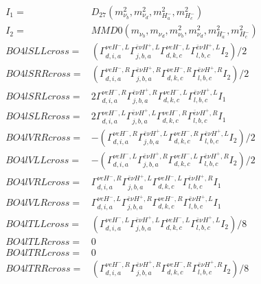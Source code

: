 \documentclass[A4,landscape]{article}
\begin{document}
\begin{align} 
I_1 = & D_{27}(m^2_{\nu_{{b}}}, m^2_{\nu_{{d}}}, m^2_{H^-_{{a}}}, m^2_{H^-_{{c}}}) \\ 
I_2 = & MMD0(m_{\nu_{{b}}}, m_{\nu_{{d}}}, m^2_{\nu_{{b}}}, m^2_{\nu_{{d}}}, m^2_{H^-_{{a}}}, m^2_{H^-_{{c}}}) \\ 
  BO4lSLLcross= & ( \Gamma^{\nu e H^- ,L}_{d, i, a} \Gamma^{\bar{e}\nu H^+,L}_{j, b, a} \Gamma^{\nu e H^- ,L}_{d, k, c} \Gamma^{\bar{e}\nu H^+,L}_{l, b, c} I_2)/2 \\ 
  BO4lSRRcross= & ( \Gamma^{\nu e H^- ,R}_{d, i, a} \Gamma^{\bar{e}\nu H^+,R}_{j, b, a} \Gamma^{\nu e H^- ,R}_{d, k, c} \Gamma^{\bar{e}\nu H^+,R}_{l, b, c} I_2)/2 \\ 
  BO4lSRLcross= & 2  \Gamma^{\nu e H^- ,R}_{d, i, a} \Gamma^{\bar{e}\nu H^+,R}_{j, b, a} \Gamma^{\nu e H^- ,L}_{d, k, c} \Gamma^{\bar{e}\nu H^+,L}_{l, b, c} I_1 \\ 
  BO4lSLRcross= & 2  \Gamma^{\nu e H^- ,L}_{d, i, a} \Gamma^{\bar{e}\nu H^+,L}_{j, b, a} \Gamma^{\nu e H^- ,R}_{d, k, c} \Gamma^{\bar{e}\nu H^+,R}_{l, b, c} I_1 \\ 
  BO4lVRRcross= & -( \Gamma^{\nu e H^- ,R}_{d, i, a} \Gamma^{\bar{e}\nu H^+,L}_{j, b, a} \Gamma^{\nu e H^- ,R}_{d, k, c} \Gamma^{\bar{e}\nu H^+,L}_{l, b, c} I_2)/2 \\ 
  BO4lVLLcross= & -( \Gamma^{\nu e H^- ,L}_{d, i, a} \Gamma^{\bar{e}\nu H^+,R}_{j, b, a} \Gamma^{\nu e H^- ,L}_{d, k, c} \Gamma^{\bar{e}\nu H^+,R}_{l, b, c} I_2)/2 \\ 
  BO4lVRLcross= &  \Gamma^{\nu e H^- ,R}_{d, i, a} \Gamma^{\bar{e}\nu H^+,L}_{j, b, a} \Gamma^{\nu e H^- ,L}_{d, k, c} \Gamma^{\bar{e}\nu H^+,R}_{l, b, c} I_1 \\ 
  BO4lVLRcross= &  \Gamma^{\nu e H^- ,L}_{d, i, a} \Gamma^{\bar{e}\nu H^+,R}_{j, b, a} \Gamma^{\nu e H^- ,R}_{d, k, c} \Gamma^{\bar{e}\nu H^+,L}_{l, b, c} I_1 \\ 
  BO4lTLLcross= & ( \Gamma^{\nu e H^- ,L}_{d, i, a} \Gamma^{\bar{e}\nu H^+,L}_{j, b, a} \Gamma^{\nu e H^- ,L}_{d, k, c} \Gamma^{\bar{e}\nu H^+,L}_{l, b, c} I_2)/8 \\ 
  BO4lTLRcross= & 0 \\ 
  BO4lTRLcross= & 0 \\ 
  BO4lTRRcross= & ( \Gamma^{\nu e H^- ,R}_{d, i, a} \Gamma^{\bar{e}\nu H^+,R}_{j, b, a} \Gamma^{\nu e H^- ,R}_{d, k, c} \Gamma^{\bar{e}\nu H^+,R}_{l, b, c} I_2)/8 \\ 
\end{align} 
\end{document}
